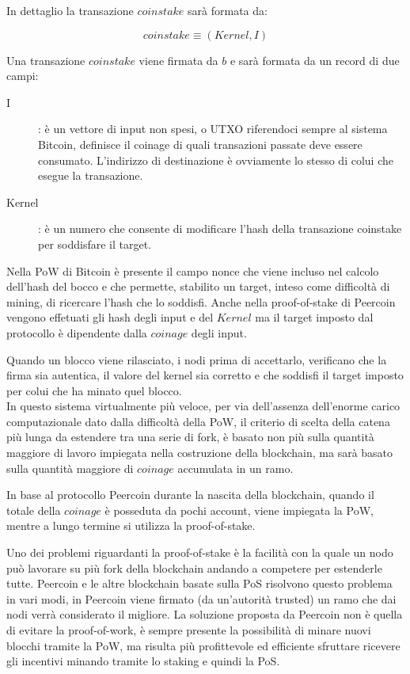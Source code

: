 	In dettaglio la transazione $coinstake$ sarà formata da:
	
			\begin{equation}
			coinstake \equiv (Kernel,I)
			\end{equation}
			
	Una transazione $coinstake$ viene firmata da $b$ e sarà formata da un record di due campi:
	\begin{description}
		\item[I] : è un vettore di input non spesi, o UTXO  riferendoci sempre al sistema Bitcoin, definisce il coinage di quali transazioni passate deve essere consumato. L'indirizzo di destinazione è ovviamente lo stesso di colui che esegue la transazione.
		\item[Kernel] : è un numero che consente di modificare l'hash della transazione coinstake per soddisfare il target.
	\end{description}
	
	Nella PoW di Bitcoin è presente il campo nonce che viene incluso nel calcolo dell'hash del bocco e che permette, stabilito un target, inteso come difficoltà di mining, di ricercare l'hash che lo soddisfi. Anche nella proof-of-stake di Peercoin vengono effetuati gli hash degli input e del $Kernel$ ma il target imposto dal protocollo è dipendente dalla $coinage$ degli input. 
	
	Quando un blocco viene rilasciato, i nodi prima di accettarlo, verificano che la firma sia autentica, il valore del kernel sia corretto e che soddisfi il target imposto per colui che ha minato quel blocco.\\
	

	In questo sistema virtualmente più veloce, per via dell'assenza dell'enorme carico computazionale dato dalla difficoltà della PoW, il criterio di scelta della catena più lunga da estendere tra una serie di fork, è basato non più sulla quantità maggiore di lavoro impiegata nella costruzione della blockchain, ma sarà basato sulla quantità maggiore di $coinage$ accumulata in un ramo.
	
	In base al protocollo Peercoin durante la nascita della blockchain, quando il totale della $coinage$ è posseduta da pochi account, viene impiegata la PoW, mentre a lungo termine si utilizza la proof-of-stake.
	
	Uno dei problemi riguardanti la proof-of-stake è la facilità con la quale un nodo può lavorare su più fork della blockchain andando a competere per estenderle tutte. Peercoin e le altre blockchain basate sulla PoS risolvono questo problema in vari modi, in Peercoin viene firmato (da un'autorità trusted) un ramo che dai nodi verrà considerato il migliore.
	La soluzione proposta da Peercoin non è quella di evitare la proof-of-work, è sempre presente la possibilità di minare nuovi blocchi tramite la PoW, ma risulta più profittevole ed efficiente sfruttare ricevere gli incentivi minando tramite lo staking e quindi la PoS.
	

